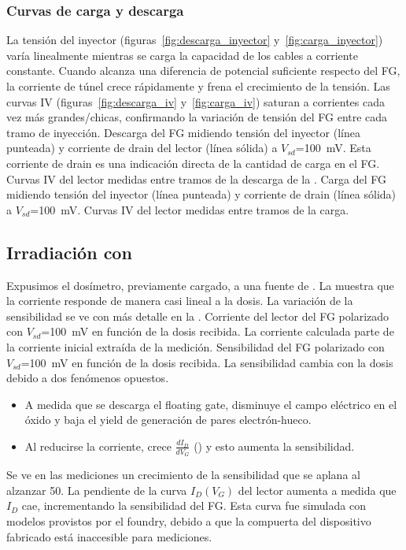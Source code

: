 \subsubsection{Curvas de carga y descarga}
La tensión del inyector (figuras~\ref{fig:descarga_inyector}
y~\ref{fig:carga_inyector})
varía linealmente mientras se carga la capacidad de los cables a corriente
constante.
Cuando alcanza una diferencia de potencial suficiente respecto del FG,
la corriente de túnel crece rápidamente y frena el crecimiento de la tensión.
Las curvas IV (figuras~\ref{fig:descarga_iv}
y~\ref{fig:carga_iv}) saturan a corrientes cada vez más grandes/chicas,
confirmando la variación de tensión del FG entre cada tramo
de inyección.
{Descarga del FG midiendo tensión del inyector (línea punteada) y
corriente de drain del lector (línea sólida) a
$V_{sd}$=\SI{100}{\milli\volt}.
Esta corriente de drain es una indicación directa 
de la cantidad de carga en el FG.}
{Curvas IV del lector medidas entre tramos de la descarga
    de la .}
{Carga del FG midiendo tensión del inyector (línea punteada) y
corriente de drain (línea sólida) a
$V_{sd}$=\SI{100}{\milli\volt}.}
{Curvas IV del lector medidas entre tramos de la carga.}
\subsection{Irradiación con \Strontium}
Expusimos el dosímetro,
previamente cargado,
a una fuente de \Strontium.
La  muestra que la corriente responde de
manera casi lineal a la dosis.
La variación de la sensibilidad se ve con más detalle en la
.
{Corriente del lector del FG polarizado con
    $V_{sd}$=\SI{100}{\milli\volt} en función de la dosis recibida.
La corriente calculada parte de la corriente inicial extraída de la
medición.}
{Sensibilidad del FG polarizado con
    $V_{sd}$=\SI{100}{\milli\volt} en función de la dosis recibida.
}
La sensibilidad cambia con la dosis debido a dos fenómenos opuestos.
\begin{itemize}
    \item A medida que se descarga el floating gate, disminuye el 
        campo eléctrico en el óxido y baja el yield de generación de pares 
        electrón-hueco.
    \item Al reducirse la corriente, crece $\frac{dI_D}{dV_G}$ 
        () y esto aumenta la sensibilidad.
\end{itemize}
Se ve en las mediciones un crecimiento de la sensibilidad que se aplana al
alzanzar \SI{50}{\Gray}.
{La pendiente de la curva $I_D(V_G)$ del lector aumenta a medida que $I_D$ cae,
incrementando la sensibilidad del FG.
Esta curva fue simulada con modelos provistos por el foundry,
debido a que la compuerta del dispositivo fabricado está inaccesible para
mediciones.}
